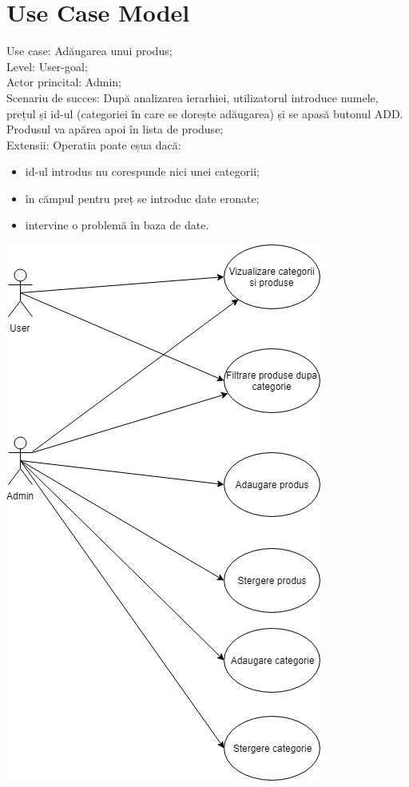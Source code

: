 \documentclass[11pt,a4paper,twoside,notitlepage]{article}
\begin{document}
\section{Use Case Model}

Use case: Adăugarea unui produs; \\
Level: User-goal; \\
Actor princital: Admin; \\
Scenariu de succes: După analizarea ierarhiei, utilizatorul introduce numele, prețul și id-ul (categoriei în care se dorește adăugarea) și se apasă butonul ADD. Produsul va apărea apoi în lista de produse; \\
Extensii: Operatia poate eșua dacă:
\begin{itemize}
	\item id-ul introdus nu corespunde nici unei categorii;
	\item în cămpul pentru preț se introduc date eronate;	
	\item intervine o problemă în baza de date.
\end{itemize}
\newpage
\includegraphics[height=.5\textheight]{useCases}
\end{document}
